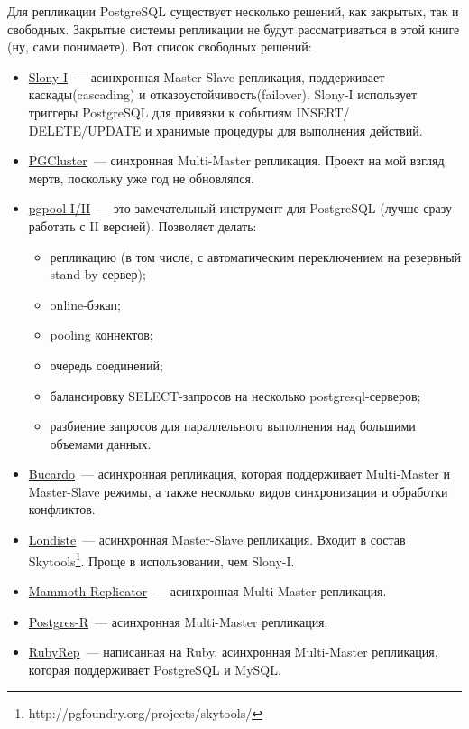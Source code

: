 Для репликации PostgreSQL существует несколько решений, как закрытых, так и свободных.
Закрытые системы репликации не будут рассматриваться в этой книге (ну, сами понимаете). Вот список свободных решений:
\begin{itemize}
\item \href{http://www.slony.info/}{Slony-I}~--- асинхронная Master-Slave репликация,
поддерживает каскады(cascading) и отказоустойчивость(failover).
Slony-I использует триггеры PostgreSQL для привязки к событиям INSERT/ DELETE/UPDATE и хранимые
процедуры для выполнения действий.

\item \href{http://pgfoundry.org/projects/pgcluster/}{PGCluster}~--- синхронная Multi-Master репликация.
Проект на мой взгляд мертв, поскольку уже год не обновлялся.

\item \href{http://pgpool.projects.postgresql.org/}{pgpool-I/II}~--- это замечательный инструмент для
PostgreSQL (лучше сразу работать с II версией). Позволяет делать:
\begin{itemize}
\item репликацию (в том числе, с автоматическим переключением на резервный stand-by сервер);
\item online-бэкап;
\item pooling коннектов;
\item очередь соединений;
\item балансировку SELECT-запросов на несколько postgresql-серверов;
\item разбиение запросов для параллельного выполнения над большими объемами данных.
\end{itemize}

\item \href{http://bucardo.org/}{Bucardo}~--- асинхронная репликация, которая поддерживает Multi-Master и Master-Slave режимы,
а также несколько видов синхронизации и обработки конфликтов.

\item \href{http://skytools.projects.postgresql.org/doc/londiste.ref.html}{Londiste}~--- асинхронная Master-Slave
репликация. Входит в состав Skytools\footnote{http://pgfoundry.org/projects/skytools/}. Проще в использовании, чем Slony-I.

\item \href{http://www.commandprompt.com/products/mammothreplicator/}{Mammoth Replicator}~--- асинхронная
Multi-Master репликация.

\item \href{http://www.postgres-r.org/}{Postgres-R}~--- асинхронная Multi-Master репликация.

\item \href{http://www.rubyrep.org/}{RubyRep}~--- написанная на Ruby, асинхронная Multi-Master
репликация, которая поддерживает PostgreSQL и MySQL.
\end{itemize}

